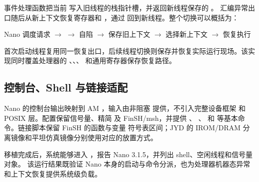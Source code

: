 事件处理函数把当前  写入旧线程的栈指针槽，并返回新线程保存的 。
汇编异常出口随后从新上下文恢复寄存器和 ，通过  回到新线程。整个切换可以概括为：

\begin{center}
\small
Nano 调度请求 $\rightarrow$ 
$\rightarrow$  自陷 $\rightarrow$ 保存旧上下文
$\rightarrow$ 选择新上下文 $\rightarrow$  恢复执行
\end{center}

首次启动线程复用同一恢复出口，后续线程切换则保存并恢复实际运行现场。该实现同时覆盖处理器的
、、、 和通用寄存器保存恢复路径。

\subsection{控制台、Shell 与链接适配}

Nano 的控制台输出映射到 AM ，输入由非阻塞  提供，不引入完整设备框架
和 POSIX 层。配置保留信号量、精简  及 FinSH/msh，并提供 、
、 和  等基本命令。链接脚本保留 FinSH 的函数与变量
符号表区间；JYD 的 IROM/DRAM 分离镜像和平坦仿真镜像分别使用对应的放置方式。

移植完成后，系统能够进入 ，报告 Nano 3.1.5，并列出 shell、空闲线程和信号量对象。
该运行结果既验证 Nano 本身的启动与命令分派，也为处理器机器态异常和上下文恢复提供系统级负载。
